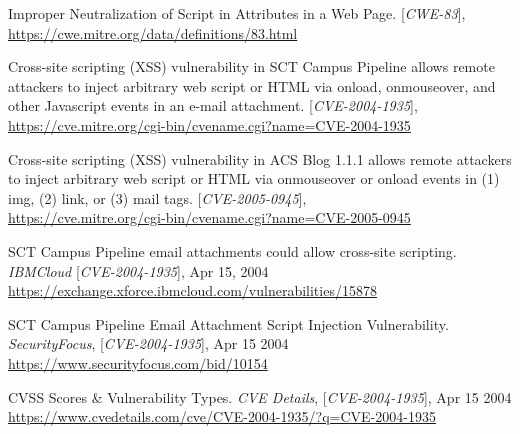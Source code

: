 \newpage
\begin{thebibliography}{9}
%
%
Improper Neutralization of Script in Attributes in a Web Page. [\textit{CWE-83}],  \\ \url{https://cwe.mitre.org/data/definitions/83.html}

Cross-site scripting (XSS) vulnerability in SCT Campus Pipeline allows remote attackers to inject arbitrary web script or HTML via onload, onmouseover, and other Javascript events in an e-mail attachment.  [\textit{CVE-2004-1935}],  \\ \url{https://cve.mitre.org/cgi-bin/cvename.cgi?name=CVE-2004-1935}

Cross-site scripting (XSS) vulnerability in ACS Blog 1.1.1 allows remote attackers to inject arbitrary web script or HTML via onmouseover or onload events in (1) img, (2) link, or (3) mail tags.  [\textit{CVE-2005-0945}],  \\ \url{https://cve.mitre.org/cgi-bin/cvename.cgi?name=CVE-2005-0945}

SCT Campus Pipeline email attachments could allow cross-site scripting.  \textit{IBMCloud} [\textit{CVE-2004-1935}], Apr 15, 2004  \\ \url{https://exchange.xforce.ibmcloud.com/vulnerabilities/15878}

 SCT Campus Pipeline Email Attachment Script Injection Vulnerability. \textit{SecurityFocus}, [\textit{CVE-2004-1935}], Apr 15 2004 \\ \url{https://www.securityfocus.com/bid/10154}
 
 	CVSS Scores \& Vulnerability Types. \textit{CVE Details}, [\textit{CVE-2004-1935}], Apr 15 2004  \\ \url{https://www.cvedetails.com/cve/CVE-2004-1935/?q=CVE-2004-1935}


\end{thebibliography}
